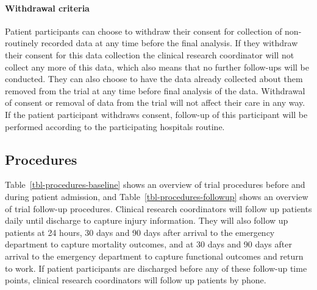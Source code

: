 \documentclass[
]{scrartcl}
\let\oldparagraph\paragraph
\renewcommand{\paragraph}[1]{\oldparagraph{#1}\mbox{}}
\begin{document}
\hypertarget{withdrawal-criteria}{%
\paragraph{Withdrawal criteria}\label{withdrawal-criteria}}

Patient participants can choose to withdraw their consent for collection
of non-routinely recorded data at any time before the final analysis. If
they withdraw their consent for this data collection the clinical
research coordinator will not collect any more of this data, which also
means that no further follow-ups will be conducted. They can also choose
to have the data already collected about them removed from the trial at
any time before final analysis of the data. Withdrawal of consent or
removal of data from the trial will not affect their care in any way. If
the patient participant withdraws consent, follow-up of this participant
will be performed according to the participating hospitals routine.

\hypertarget{procedures}{%
\subsection{Procedures}\label{procedures}}

Table~\ref{tbl-procedures-baseline} shows an overview of trial
procedures before and during patient admission, and
Table~\ref{tbl-procedures-followup} shows an overview of trial follow-up
procedures. Clinical research coordinators will follow up patients daily
until discharge to capture injury information. They will also follow up
patients at 24 hours, 30 days and 90 days after arrival to the emergency
department to capture mortality outcomes, and at 30 days and 90 days
after arrival to the emergency department to capture functional outcomes
and return to work. If patient participants are discharged before any of
these follow-up time points, clinical research coordinators will follow
up patients by phone.
\end{document}
